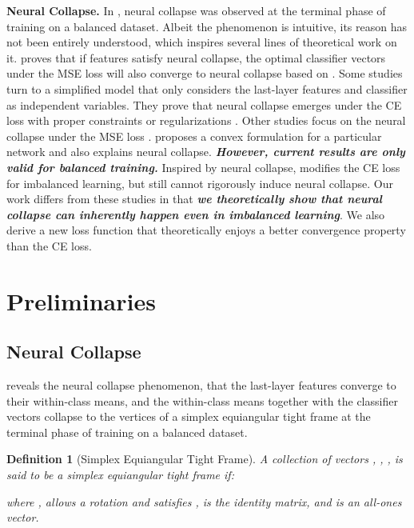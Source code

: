 \documentclass{article}
\newtheorem{definition}{Definition}
\newcommand{\<}{\left\langle}
\renewcommand{\>}{\right\rangle}
\begin{document}
\textbf{Neural Collapse.} In \cite{papyan2020prevalence}, neural collapse was observed at the terminal phase of training on a balanced dataset. 
Albeit the phenomenon is intuitive, its reason has not been entirely understood, which inspires several lines of theoretical work on it.  \cite{papyan2020prevalence} proves that if features satisfy neural collapse, the optimal classifier vectors under the MSE loss will also converge to neural collapse based on \cite{webb1990optimised}. Some studies turn to a simplified model that only considers the last-layer features and classifier as independent variables. They prove that neural collapse emerges under the CE loss with proper constraints or regularizations \cite{weinan2020emergence,fang2021exploring,lu2020neural,zhu2021geometric,ji2021unconstrained,graf2021dissecting}. Other studies focus on the neural collapse under the MSE loss \cite{mixon2020neural,han2021neural,poggio2020explicit,tirer2022extended,zhou2022optimization,rangamani2022neural}. \cite{ergen2021revealing} proposes a convex formulation for a particular network and also explains neural collapse. \emph{\textbf{However, current results are only valid for balanced training.}}  Inspired by neural collapse, \cite{xie2022neural} modifies the CE loss for imbalanced learning, but still cannot rigorously induce neural collapse. 
Our work differs from these studies in that \emph{\textbf{we theoretically show that neural collapse can inherently happen even in imbalanced learning}}. We also derive a new loss function that theoretically enjoys a better convergence property than the CE loss.








\vspace{-1.5mm}
\section{Preliminaries}
\vspace{-1mm}

\subsection{Neural Collapse}
\vspace{-1mm}
\cite{papyan2020prevalence} reveals the neural collapse phenomenon, that the last-layer features converge to their within-class means, and the within-class means together with the classifier vectors collapse to the vertices of a simplex equiangular tight frame at the terminal phase of training on a balanced dataset.
\begin{definition}[Simplex Equiangular Tight Frame]
	\label{ETF}
	A collection of vectors , , , is said to be a simplex equiangular tight frame if:
	
	where ,  allows a rotation and satisfies ,  is the identity matrix, and  is an all-ones vector. 
\end{definition}
\end{document}

